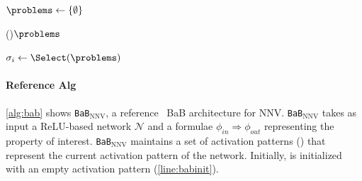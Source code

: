\documentclass[oneside,11pt,dvipsnames]{book}
\numberwithin{equation}{section}
\theoremstyle{definition}
\theoremstyle{remark}
\newcommand{\bab}{\texttt{BaB$_{\text{NNV}}$}}
\begin{document}





\begin{algorithm}[t]
    \small
    \BlankLine

    $\problems \leftarrow \{ \emptyset \}$ \label{line:babinit}


    \While(){$\problems$}{\label{line:babstart}
        $\sigma_i \gets \Select(\problems)$ \label{line:babselect}

    }\label{line:babend}
    \Return{\myunsat}\label{line:babunsat}

    \caption{The \bab{} algorithm.}\label{alg:bab}
\end{algorithm}


\paragraph{Reference Alg} \autoref{alg:bab} shows \bab{}, a reference~\cite{nakagawa2014consolidating} BaB architecture for NNV. \bab{} takes as input a ReLU-based network $\mathcal{N}$ and a formulae $\phi_{in}\Rightarrow \phi_{out}$ representing the property of interest.
\bab{} maintains a set of activation patterns (\problems) that represent the current activation pattern of the network. Initially, \problems is initialized with an empty activation pattern (\autoref{line:babinit}).
\end{document}
